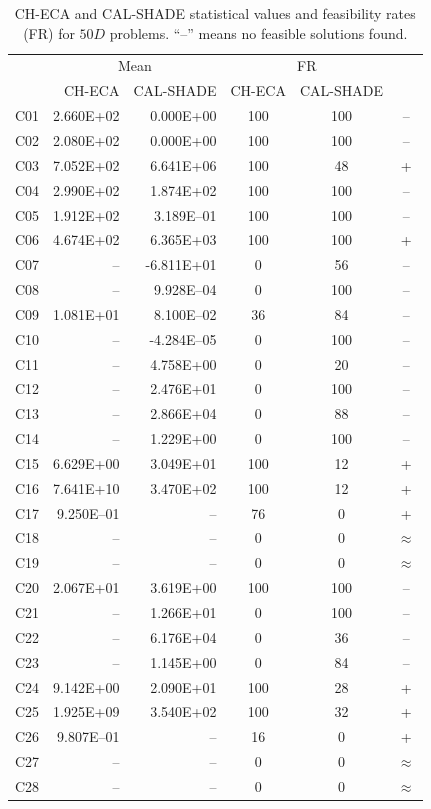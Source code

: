 \documentclass[conference]{IEEEtran}
\begin{document}
% 
% 
% 
\begin{table}[!]
	\caption{CH-ECA and CAL-SHADE statistical values and feasibility rates (FR) for $50D$ problems. ``--'' means no feasible solutions found.}
	\centering
	\begin{tabular}{|c|r|r|c|c|c|}
	 \hline
	 &\multicolumn{2}{|c|}{Mean} & \multicolumn{2}{|c|}{FR} & \\
	\cline{2-5}
	 & CH-ECA & CAL-SHADE & CH-ECA & CAL-SHADE & \\ \hline

C01 & 2.660E+02 & 0.000E+00 &  100 &  100 & -- \\ 
C02 & 2.080E+02 & 0.000E+00 &  100 &  100 & -- \\ 
C03 & 7.052E+02 & 6.641E+06 &  100 &   48 & + \\ 
C04 & 2.990E+02 & 1.874E+02 &  100 &  100 & -- \\ 
C05 & 1.912E+02 & 3.189E--01 &  100 &  100 & -- \\ 
C06 & 4.674E+02 & 6.365E+03 &  100 &  100 & + \\ 
C07 &  -- & -6.811E+01 &    0 &   56 & -- \\ 
C08 &  -- & 9.928E--04 &    0 &  100 & -- \\ 
C09 & 1.081E+01 & 8.100E--02 &   36 &   84 & -- \\ 
C10 &  -- & -4.284E--05 &    0 &  100 & -- \\ 
C11 &  -- & 4.758E+00 &    0 &   20 & -- \\ 
C12 &  -- & 2.476E+01 &    0 &  100 & -- \\ 
C13 &  -- & 2.866E+04 &    0 &   88 & -- \\ 
C14 &  -- & 1.229E+00 &    0 &  100 & -- \\ 
C15 & 6.629E+00 & 3.049E+01 &  100 &   12 & + \\ 
C16 & 7.641E+10 & 3.470E+02 &  100 &   12 & + \\ 
C17 & 9.250E--01 &  -- &   76 &    0 & + \\ 
C18 &  -- &  -- &    0 &    0 & $\approx$ \\ 
C19 &  -- &  -- &    0 &    0 & $\approx$ \\ 
C20 & 2.067E+01 & 3.619E+00 &  100 &  100 & -- \\ 
C21 &  -- & 1.266E+01 &    0 &  100 & -- \\ 
C22 &  -- & 6.176E+04 &    0 &   36 & -- \\ 
C23 &  -- & 1.145E+00 &    0 &   84 & -- \\ 
C24 & 9.142E+00 & 2.090E+01 &  100 &   28 & + \\ 
C25 & 1.925E+09 & 3.540E+02 &  100 &   32 & + \\ 
C26 & 9.807E--01 &  -- &   16 &    0 & + \\ 
C27 &  -- &  -- &    0 &    0 & $\approx$ \\ 
C28 &  -- &  -- &    0 &    0 & $\approx$ \\ 
   \hline
	\end{tabular}
	\label{tab:d50c}
\end{table}
\end{document}

